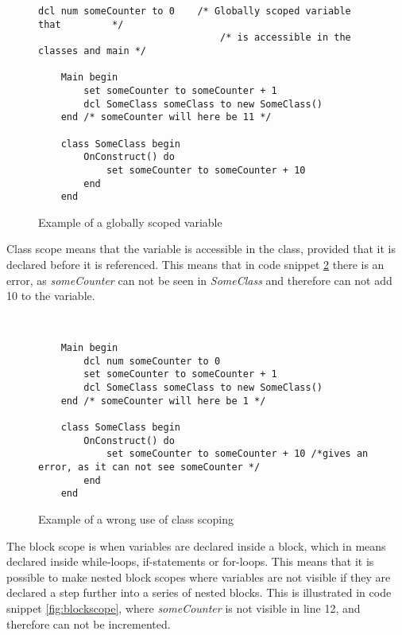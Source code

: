 \begin{figure}[H]
    \centering
    
    \begin{lstlisting}[style=gglang]
    dcl num someCounter to 0    /* Globally scoped variable that         */
                                /* is accessible in the classes and main */
    
    Main begin
        set someCounter to someCounter + 1
        dcl SomeClass someClass to new SomeClass()
    end /* someCounter will here be 11 */
    
    class SomeClass begin
        OnConstruct() do 
            set someCounter to someCounter + 10
        end
    end
    \end{lstlisting}
    \caption{Example of a globally scoped variable}
    \label{fig:globalscope}
\end{figure}

Class scope means that the variable is accessible in the class, provided that it is declared before it is referenced. This means that in code snippet \ref{fig:classscope} there is an error, as \textit{someCounter} can not be seen in \textit{SomeClass} and therefore can not add 10 to the variable.

\begin{figure}[H]
    \centering
    
    \begin{lstlisting}[style=gglang]
    
    
    Main begin
        dcl num someCounter to 0
        set someCounter to someCounter + 1
        dcl SomeClass someClass to new SomeClass()
    end /* someCounter will here be 1 */
    
    class SomeClass begin
        OnConstruct() do 
            set someCounter to someCounter + 10 /*gives an error, as it can not see someCounter */
        end
    end 
    \end{lstlisting}
    \caption{Example of a wrong use of class scoping}
    \label{fig:classscope}
\end{figure}

The block scope is when variables are declared inside a block, which in \lang{} means declared inside while-loops, if-statements or for-loops. This means that it is possible to make nested block scopes where variables are not visible if they are declared a step further into a series of nested blocks. This is illustrated in code snippet \ref{fig:blockscope}, where \textit{someCounter} is not visible in line 12, and therefore can not be incremented.

